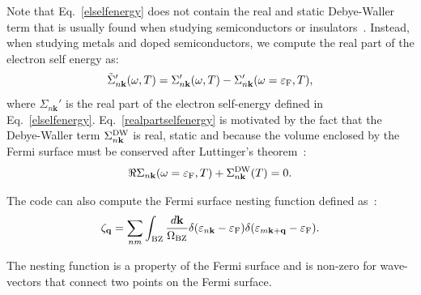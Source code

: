 \documentclass[final,3p,times,twocolumn]{elsarticle}
\begin{document}
Note that Eq.~\eqref{elselfenergy} does not contain the real and static Debye-Waller term that is usually found when studying semiconductors or insulators~\cite{Allen1976,Allen1981,Allen1983,Ponce2014a,Giustino2016}. 
Instead, when studying metals and doped semiconductors, we compute the real part of the electron self energy as: 
\begin{equation}\label{realpartselfenergy}
 \tilde{\Sigma}_{n\mathbf{k}}'(\omega,T) = \Sigma'_{n\mathbf{k}}(\omega,T) - \Sigma_{n\mathbf{k}}'(\omega=\varepsilon_{\rm F},T),
\end{equation}
where $\Sigma_{n\mathbf{k}}'$ is the real part of the electron self-energy defined in Eq.~\eqref{elselfenergy}.
Eq.~\eqref{realpartselfenergy} is motivated by the fact that the Debye-Waller term $\Sigma_{n\mathbf{k}}^{\rm DW}$ is real, static and because the
volume enclosed by the Fermi surface must be conserved after Luttinger's theorem~\cite{Luttinger1960}:
\begin{equation}
 \Re \Sigma_{n\mathbf{k}}(\omega=\varepsilon_{\rm F},T) + \Sigma_{n\mathbf{k}}^{\rm DW}(T) = 0.
\end{equation}


The code can also compute the Fermi surface nesting function defined as~\cite{Bazhirov2010}:
\begin{equation}\label{nestingfct}
\zeta_{\mathbf{q}} = \sum_{nm} \int_{\rm BZ} \frac{d\mathbf{k}}{\Omega_{\rm BZ}} \delta(\varepsilon_{n\mathbf{k}}-\varepsilon_{\rm F}) \delta(\varepsilon_{m\mathbf{k+q}}-\varepsilon_{\rm F}).
\end{equation}

The nesting function is a property of the Fermi surface and is non-zero for wave-vectors that connect two points on the Fermi surface. 
\end{document}
